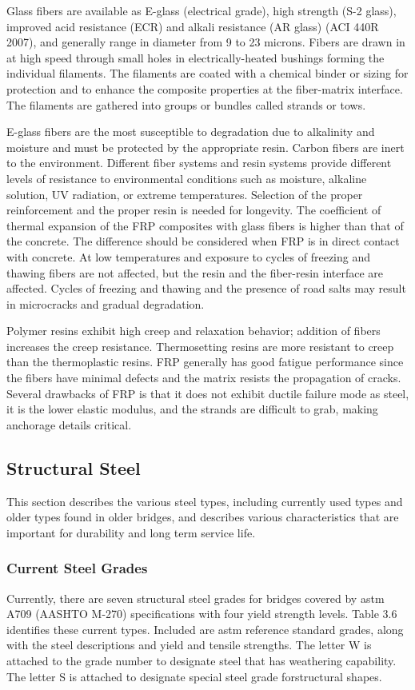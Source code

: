 Glass fibers are available as E-glass (electrical grade), high strength (S-2 glass), improved acid resistance (ECR)
and alkali resistance (AR glass) (ACI 440R 2007), and generally range in diameter from 9 to 23 microns. Fibers are
drawn in at high speed through small holes in electrically-heated bushings forming the individual filaments. The
filaments are coated with a chemical binder or sizing for protection and to enhance the composite properties at the
fiber-matrix interface. The filaments are gathered into groups or bundles called strands or tows.

E-glass fibers are the most susceptible to degradation due to alkalinity and moisture and must be protected by the
appropriate resin. Carbon fibers are inert to the environment. Different fiber systems and resin systems provide
different levels of resistance to environmental conditions such as moisture, alkaline solution, UV radiation, or
extreme temperatures. Selection of the proper reinforcement and the proper resin is needed for longevity. The
coefficient of thermal expansion of the FRP composites with glass fibers is higher than that of the concrete. The
difference should be considered when FRP is in direct contact with concrete. At low temperatures and exposure to
cycles of freezing and thawing fibers are not affected, but the resin and the fiber-resin interface are affected. Cycles
of freezing and thawing and the presence of road salts may result in microcracks and gradual degradation.

Polymer resins exhibit high creep and relaxation behavior; addition of fibers increases the creep resistance.
Thermosetting resins are more resistant to creep than the thermoplastic resins. FRP generally has good fatigue
performance since the fibers have minimal defects and the matrix resists the propagation of cracks. Several
drawbacks of FRP is that it does not exhibit ductile failure mode as steel, it is the lower elastic modulus, and the
strands are difficult to grab, making anchorage details critical.

\subsection{Structural Steel}
This section describes the various steel types, including currently used types and older types found in older bridges, and describes various characteristics that are important for durability and long term service life.

\subsubsection{Current Steel Grades}
Currently, there are seven structural steel grades for bridges covered by \acrshort*{astm} A709 (AASHTO M-270) specifications with four yield strength levels. Table 3.6 identifies these current types. Included are \acrshort*{astm} reference standard grades, along with the steel descriptions and yield and tensile strengths. The letter W is attached to the grade number to designate steel that has weathering capability. The letter S is attached to designate special steel grade forstructural shapes.

